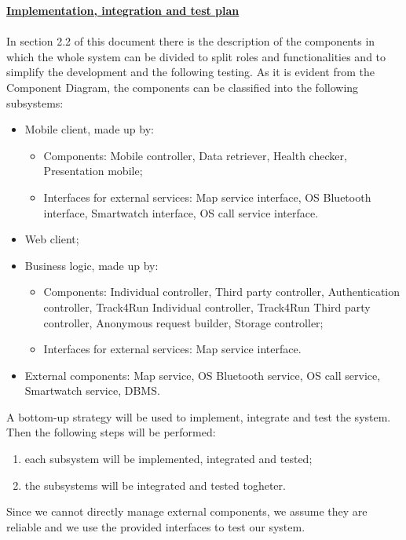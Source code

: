 	\underline{\textbf{Implementation, integration and test plan}}\\\\
In section 2.2 of this document there is the description of the components in which the whole system can be divided to split roles and functionalities and to simplify the development and the following testing.
As it is evident from the Component Diagram, the components can be classified into the following subsystems:
	\begin{itemize}
	\item Mobile client, made up by:
		\begin{itemize}
		\item Components: Mobile controller,  Data retriever, Health checker, Presentation mobile;
		\item Interfaces for external services: Map service interface, OS Bluetooth interface, Smartwatch interface, OS call service interface.
		\end{itemize}
	\item Web client;
	\item Business logic, made up by:
		\begin{itemize}
		\item Components: Individual controller, Third party controller, Authentication controller, Track4Run Individual controller, Track4Run Third party controller, Anonymous request builder, Storage controller;
		\item Interfaces for external services: Map service interface.
		\end{itemize}
	\item External components: Map service, OS Bluetooth service, OS call service, Smartwatch service, DBMS.\\
	\end{itemize}

A bottom-up strategy will be used to implement, integrate and test the system. Then the following steps will be performed:
	\begin{enumerate} 
	\item each subsystem will be implemented, integrated and tested;
	\item the subsystems will be integrated and tested togheter.\\
	\end{enumerate}
Since we cannot directly manage external components, we assume they are reliable and we use the provided interfaces to test our system.\\

